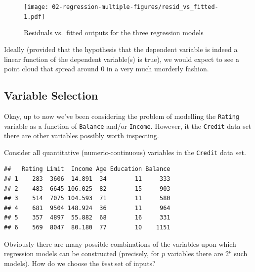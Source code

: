 \documentclass[10pt,b5paper,krantz1]{krantz}
\newenvironment{Shaded}{\begin{snugshade}}{\end{snugshade}}
\newcommand{\DecValTok}[1]{\textcolor[rgb]{0.06,0.06,0.06}{#1}}
\newcommand{\KeywordTok}[1]{\textcolor[rgb]{0.27,0.27,0.27}{\textbf{#1}}}
\newcommand{\NormalTok}[1]{#1}
\newcommand{\OperatorTok}[1]{\textcolor[rgb]{0.43,0.43,0.43}{\textbf{#1}}}
\newcommand{\StringTok}[1]{\textcolor[rgb]{0.5,0.5,0.5}{#1}}
\begin{document}
\begin{figure}
\hypertarget{fig:resid_vs_fitted}{%
\centering
\texttt{[image: 02-regression-multiple-figures/resid\_vs\_fitted-1.pdf]}
\caption{Residuals vs.~fitted outputs for the three regression models}\label{fig:resid_vs_fitted}
}
\end{figure}

Ideally (provided that the hypothesis that the dependent variable
is indeed a linear function of the dependent variable(s) is true),
we would expect to see a point cloud that spread around \(0\) in a
very much unorderly fashion.

\hypertarget{variable-selection}{%
\subsection{Variable Selection}\label{variable-selection}}

Okay, up to now we've been considering the problem of modelling
the \texttt{Rating} variable as a function of \texttt{Balance} and/or \texttt{Income}.
However, it the \texttt{Credit} data set there are other variables
possibly worth inspecting.

Consider all quantitative (numeric-continuous) variables in the \texttt{Credit} data set.

\begin{Shaded}
\end{Shaded}

\begin{verbatim}
##   Rating Limit  Income Age Education Balance
## 1    283  3606  14.891  34        11     333
## 2    483  6645 106.025  82        15     903
## 3    514  7075 104.593  71        11     580
## 4    681  9504 148.924  36        11     964
## 5    357  4897  55.882  68        16     331
## 6    569  8047  80.180  77        10    1151
\end{verbatim}

Obviously there are many possible combinations of the variables
upon which regression models can be constructed
(precisely, for \(p\) variables there are \(2^p\) such models).
How do we choose the \emph{best} set of inputs?
\end{document}
